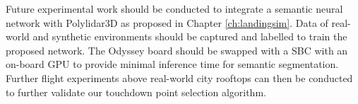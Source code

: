 Future experimental work should be conducted to integrate a semantic neural network with Polylidar3D as proposed in Chapter \ref{ch:landingsim}. Data of real-world and synthetic environments should be captured and labelled to train the proposed network. The Odyssey board should be swapped with a \ac{SBC} with an on-board \ac{GPU} to provide minimal inference time for semantic segmentation. Further flight experiments above real-world city rooftops can then be conducted to further validate our touchdown point selection algorithm.